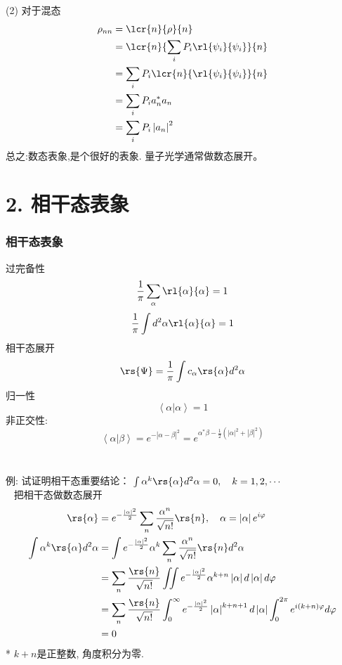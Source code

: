 \begin{frame}  
 \frametitle{}
 (2) 对于混态  
 \[ \begin{aligned}
    \rho_{nn} & = \lcr{n}{\rho}{n} \\ 
    &= \lcr{n}{\sum_i P_i \rl{\psi_i}{\psi_i}}{n} \\ 
    &= \sum_i P_i \lcr{n}{ \rl{\psi_i}{\psi_i}}{n} \\ 
    &= \sum_i P_i a^*_{n} a_{n} \\ 
    &= \sum_i P_i \left|a_{n}\right|^2
  \end{aligned}\]  
  总之:数态表象,是个很好的表象. 量子光学通常做数态展开。
\end{frame}

\section{2. 相干态表象}

\begin{frame} 
 \frametitle{相干态表象}
    过完备性
   \[\frac{1}{\pi}\sum_\alpha \rl{\alpha}{\alpha} =1 \]
   \[\frac{1}{\pi}\int d^2 \alpha \rl{\alpha}{\alpha} =1 \]
   相干态展开
   \[ \begin{aligned}
    \rs{\Psi} &= \frac{1}{\pi} \int c_\alpha \rs{\alpha} d^2 \alpha \\ 
  \end{aligned}\]
   归一性
   \[\left\langle \alpha|\alpha\right\rangle = 1 \]
   非正交性:
   \[ \left\langle \alpha| \beta \right\rangle =e^{-  \left| \alpha - \beta\right|^2} = e^{\alpha^* \beta -\frac{1}{2}(\left| \alpha \right|^2 +\left| \beta \right|^2  )  } \]
\end{frame}

\begin{frame} 
\frametitle{}
~\\
  例: 试证明相干态重要结论： $\int  \alpha^k \rs{\alpha} d^2 \alpha =0, \quad k=1,2,\cdots $ \\
  \证~ 把相干态做数态展开
  \[ \begin{aligned}
    \rs{\alpha} &=  e^{-\frac{\left|\alpha\right|^2}{2}}  \sum_n \frac{\alpha^n}{\sqrt{n!}} \rs{n} , \quad  \alpha= \left|\alpha\right| e^{i\varphi} \\
    \int  \alpha^k \rs{\alpha} d^2 \alpha &= \int   e^{-\frac{\left|\alpha\right|^2}{2}} \alpha^k  \sum_n \frac{\alpha^n}{\sqrt{n!}} \rs{n} d^2\alpha \\ 
    &= \sum_n \frac{\rs{n} }{\sqrt{n!}} \iint  e^{-\frac{\left|\alpha\right|^2}{2}} \alpha^{k+n}  \left|\alpha \right| d \left|\alpha\right|d\varphi\\
    &= \sum_n \frac{\rs{n} }{\sqrt{n!}} \int_0 ^{\infty} e^{-\frac{\left|\alpha\right|^2}{2}} \left|\alpha\right|^{k+n+1} d \left|\alpha\right| \int_0 ^{2\pi} e^{i(k+n)\varphi} d\varphi\\
    &=0
  \end{aligned}\] 
  * $k+n$是正整数, 角度积分为零.
\end{frame}

